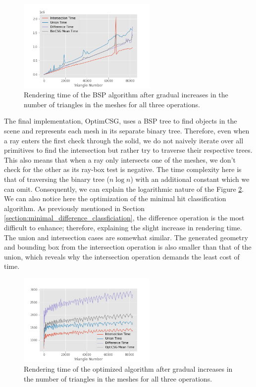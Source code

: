 \documentclass[a4paper,11pt,oneside]{article}
\begin{document}
\begin{figure}[H]
	\begin{center}
		\includegraphics[width=0.6\textwidth]{section5/BinCSG-OPS.png}
	\end{center}
	\caption{Rendering time of the BSP algorithm after gradual increases in the number of triangles in the meshes for all three operations.}
	\label{sec5.1:bsp-csg-operations}
\end{figure}

The final implementation, OptimCSG, uses a BSP tree to find objects in the scene and represents each mesh in its separate binary tree. Therefore, even when a ray enters the first check through the solid, we do not naively iterate over all primitives to find the intersection but rather try to traverse their respective trees. This also means that when a ray only intersects one of the meshes, we don't check for the other as its ray-box test is negative. The time complexity here is that of traversing the binary tree ($n\log n$) with an additional constant which we can omit. Consequently, we can explain the logarithmic nature of the Figure \ref{sec5.1:optim-csg-operations}. We can also notice here the optimization of the minimal hit classification algorithm. As previously mentioned in Section \ref{section:minimal_difference_classficiation}, the difference operation is the most difficult to enhance; therefore, explaining the slight increase in rendering time. The union and intersection cases are somewhat similar. The generated geometry and bounding box from the intersection operation is also smaller than that of the union, which reveals why the intersection operation demands the least cost of time. 

\begin{figure}[H]
	\begin{center}
		\includegraphics[width=0.6\textwidth]{section5/OptimCSG-OPS.png}
	\end{center}
	\caption{Rendering time of the optimized algorithm after gradual increases in the number of triangles in the meshes for all three operations.}
	\label{sec5.1:optim-csg-operations}
\end{figure}
\end{document}

